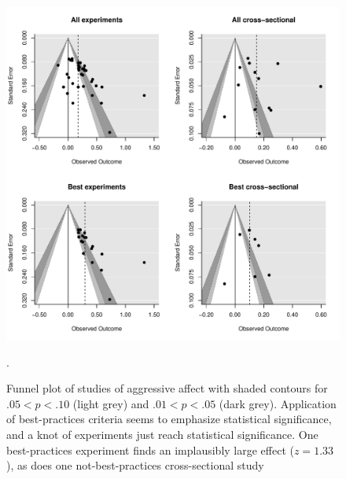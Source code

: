 \documentclass[man]{apa6}
\begin{document}
\begin{figure}
	\includegraphics[width = \textwidth, keepaspectratio]{funnels-0_AggAff.pdf}
	\caption{Funnel plot of studies of aggressive affect with shaded contours for $.05 < p < .10$ (light grey) and $.01 < p < .05$ (dark grey). Application of best-practices criteria seems to emphasize statistical significance, and a knot of experiments just reach statistical significance. One best-practices experiment \citep{Ballard:Wiest:1996} finds an implausibly large effect ($z = 1.33$), as does one not-best-practices cross-sectional study \citep[$z = 0.60$]{Urashima:Suzuki:2003}}.
	\label{funnel-aggaff}
\end{figure}
\end{document}
